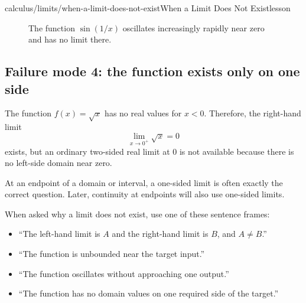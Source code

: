 \begin{webpage}{calculus/limits/when-a-limit-does-not-exist}{When a Limit Does Not Exist}{lesson}
\begin{figure}[htbp]
\centering
{}
\caption{The function \(\sin(1/x)\) oscillates increasingly rapidly near zero and has no limit there.}
\label{fig:oscillation}
\end{figure}

\subsection{Failure mode 4: the function exists only on one side}

The function \(f(x)=\sqrt{x}\) has no real values for \(x<0\). Therefore, the right-hand limit
\[
  \lim_{x\to0^+}\sqrt{x}=0
\]
exists, but an ordinary two-sided real limit at \(0\) is not available because there is no left-side domain near zero.

At an endpoint of a domain or interval, a one-sided limit is often exactly the correct question. Later, continuity at endpoints will also use one-sided limits.

\begin{bghomework}
When asked why a limit does not exist, use one of these sentence frames:
\begin{itemize}
  \item ``The left-hand limit is \(A\) and the right-hand limit is \(B\), and \(A\ne B\).''
  \item ``The function is unbounded near the target input.''
  \item ``The function oscillates without approaching one output.''
  \item ``The function has no domain values on one required side of the target.''
\end{itemize}
\end{bghomework}
\end{webpage}

